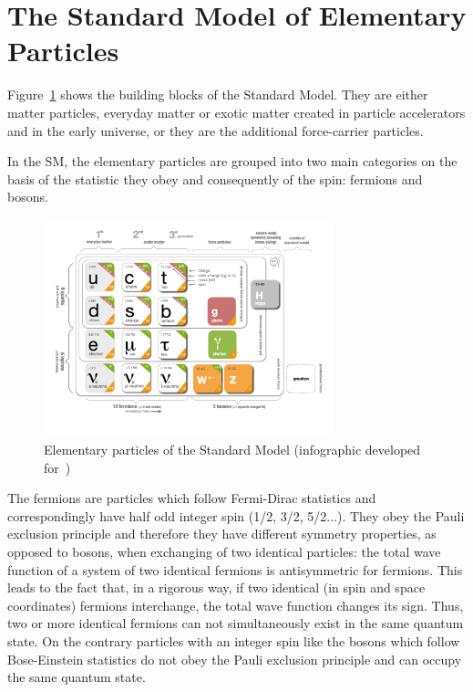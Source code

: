 \section{The Standard Model of Elementary Particles}\label{sec:sm}
Figure~\ref{fig:SMfig} shows the building blocks of the Standard Model. They are either matter particles, everyday matter
or exotic matter created in particle accelerators and in the early universe, or they are the additional force-carrier particles.

In the SM, the elementary particles are grouped into two main categories on the basis of the statistic they obey and consequently of the spin: fermions and bosons. 
\begin{figure}[h]
\centering
\includegraphics[clip,trim=1cm 2cm 2cm 1cm, width=0.75\textwidth]{Figures/c1/SMinfographic_image.png}
\caption{Elementary particles of the Standard Model (infographic
  developed for~\cite{particlefest})}
\label{fig:SMfig}
\end{figure}

The fermions are particles which follow Fermi-Dirac statistics and correspondingly have half odd integer spin (1/2, 3/2, 5/2...). They obey the Pauli exclusion principle and therefore they have different symmetry properties, as opposed to bosons, when exchanging of two identical particles: the total wave function of a system of two identical fermions is antisymmetric for fermions. This leads to the fact that, in a rigorous way, if two identical (in spin and space coordinates) fermions interchange, the total wave function changes its sign. Thus, two or more identical fermions can not simultaneously exist in the same quantum state. On the contrary particles with an integer spin like the bosons which follow Bose-Einstein statistics do not obey the Pauli exclusion principle and can occupy the same quantum state. 


